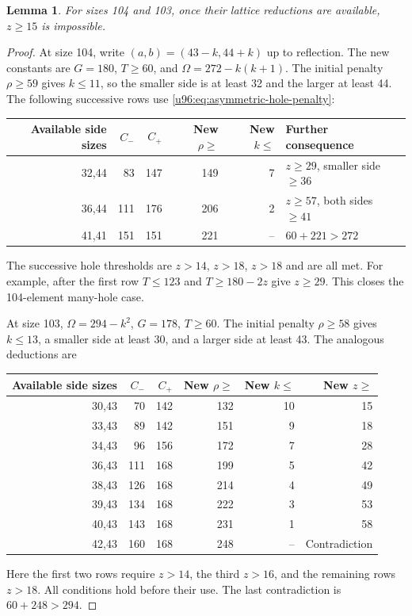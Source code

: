 \documentclass[11pt,a4paper]{article}
\newtheorem{lemma}[theorem]{Lemma}
\theoremstyle{remark}
\begin{document}
\begin{lemma}\label{u96:lem:104103-high}
For sizes 104 and 103, once their lattice reductions are available, $z\geq15$
is impossible.
\end{lemma}
\begin{proof}
At size 104, write $(a,b)=(43-k,44+k)$ up to reflection.
The new constants are $G=180$, $T\geq60$, and $\Omega=272-k(k+1)$.
The initial penalty $\rho\geq59$ gives $k\leq11$, so the smaller side is
at least 32 and the larger at least 44. The following successive rows use
\eqref{u96:eq:asymmetric-hole-penalty}:
\begin{center}\small
\begin{tabular}{rrrrrl}
\toprule
Available side sizes&$C_-$&$C_+$&New $\rho\geq$&New $k\leq$&Further consequence\\
\midrule
32,44&83&147&149&7&$z\geq29$, smaller side $\geq36$\\
36,44&111&176&206&2&$z\geq57$, both sides $\geq41$\\
41,41&151&151&221&--&$60+221>272$\\
\bottomrule
\end{tabular}
\end{center}
The successive hole thresholds are $z>14$, $z>18$, $z>18$ and are all met.
For example, after the first row $T\leq123$ and $T\geq180-2z$ give
$z\geq29$. This closes the 104-element many-hole case.

At size 103, $\Omega=294-k^2$, $G=178$, $T\geq60$. The initial penalty
$\rho\geq58$ gives $k\leq13$, a smaller side at least 30, and a larger
side at least 43. The analogous deductions are
\begin{center}\small
\begin{tabular}{rrrrrr}
\toprule
Available side sizes&$C_-$&$C_+$&New $\rho\geq$&New $k\leq$&New $z\geq$\\
\midrule
30,43&70&142&132&10&15\\
33,43&89&142&151&9&18\\
34,43&96&156&172&7&28\\
36,43&111&168&199&5&42\\
38,43&126&168&214&4&49\\
39,43&134&168&222&3&53\\
40,43&143&168&231&1&58\\
42,43&160&168&248&--&Contradiction\\
\bottomrule
\end{tabular}
\end{center}
Here the first two rows require $z>14$, the third $z>16$, and the
remaining rows $z>18$. All conditions hold before their use. The last
contradiction is $60+248>294$.
\end{proof}
\end{document}
